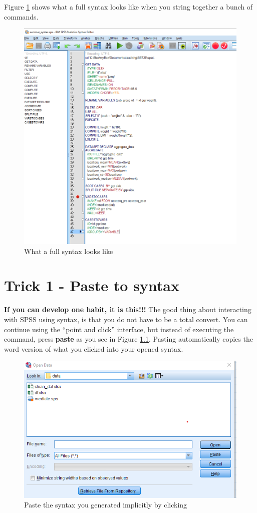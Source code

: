 \documentclass[
]{book}
\begin{document}
Figure \ref{fig:full-syntax} shows what a full syntax looks like when you string together a bunch of commands.

\begin{figure}
\includegraphics[width=1\linewidth]{images/example_syntax} \caption{What a full syntax looks like}\label{fig:full-syntax}
\end{figure}

\hypertarget{trick1}{%
\chapter{Trick 1 - Paste to syntax}\label{trick1}}

\textbf{If you can develop one habit, it is this!!!} The good thing about interacting with SPSS using syntax, is that you do not have to be a total convert. You can continue using the ``point and click'' interface, but instead of executing the command, press \textbf{paste} as you see in Figure \ref{fig:paste-syntax}. Pasting automatically copies the word version of what you clicked into your opened syntax.

\begin{figure}
\includegraphics[width=0.6\linewidth]{images/paste_syntax} \caption{Paste the syntax you generated implicitly by clicking}\label{fig:paste-syntax}
\end{figure}
\end{document}
